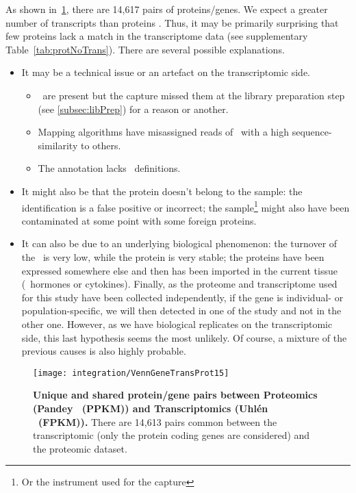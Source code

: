 As shown in~\cref{fig:VennGeneTransProt15}, there are 14,617 pairs of
proteins/genes.
We expect a greater number of transcripts than proteins .
Thus, it may be primarily surprising that
few proteins lack a match in the transcriptome data
(see supplementary Table~\cref{tab:protNoTrans}).
There are several possible explanations.
\begin{itemize}[topsep=0pt,nosep]
\item It may be a technical issue or an artefact on the transcriptomic side.
    \begin{itemize}[topsep=0pt,nosep]
        \item \mRNAs\ are present but the capture missed them at the library preparation
        step (see \cref{subsec:libPrep}) for a reason or another.
        \item Mapping algorithms have misassigned reads of
        \mRNAs\ with a high sequence-similarity to others.
        \item The annotation lacks \mRNAs\ definitions.
    \end{itemize}
\item It might also be that the protein doesn't belong to the sample: the identification
is a false positive or incorrect; the sample\footnote{Or the instrument used for
the capture} might also have been contaminated at some point with some foreign
proteins.
\item It can also be due to an underlying biological phenomenon:
the turnover of the \mRNA\ is very low, while the protein is very stable;
the proteins have been expressed somewhere else and then has been imported in the
current tissue (\eg\ hormones or cytokines). Finally, as the proteome
and transcriptome used for this study have been collected independently, if the
gene is individual- or population-specific, we will then detected in one of the
study and not in the other one. However, as we have biological replicates on the
transcriptomic side, this last hypothesis seems the most unlikely.
Of course, a mixture of the previous causes is also highly probable.
\end{itemize}

\begin{figure}[!htbp]
    \texttt{[image: integration/VennGeneTransProt15]}\centering
    \caption[Unique and shared protein/gene pairs between Proteomics
    (Pandey \etal\ (PPKM)) and
    Transcriptomics (Uhlén \etal\ (\gls{FPKM}))]
    {\label{fig:VennGeneTransProt15}\textbf{Unique and shared protein/gene
    pairs between Proteomics (Pandey \etal\ (PPKM)) and Transcriptomics (Uhlén
    \etal\  (\gls{FPKM})).} There are 14,613 pairs common between the
    transcriptomic (only the protein coding genes are considered)
    and the proteomic dataset.}
\end{figure}

